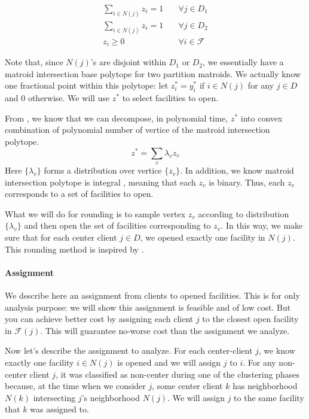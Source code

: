 \begin {align}
\sum_{i \in N(j)} z_i = 1 &\quad \forall j \in D_1 \\
\sum_{i \in N(j)} z_i = 1 &\quad \forall j \in D_2 \\
z_i \ge 0 &\quad \forall i \in \mathcal{F}
\end{align}

Note that, since $N(j)$'s are disjoint within $D_1$ or $D_2$, we essentially have
a matroid intersection base polytope for two partition matroids.
We actually know one fractional point within this polytope:
let $z^*_i = y^*_i$ if $i \in N(j)$ for any $j \in D$ and $0$ otherwise.
We will use $z^*$ to select facilities to open.

From \cite{grotschel1981ellipsoid}, we know that we can decompose,
in polynomial time, $z^*$ into convex combination of polynomial number of vertice of
the matroid intersection polytope.
\[  z^* = \sum_{v} \lambda_v z_v    \]
Here $\{\lambda_v\}$ forms a distribution over vertice $\{z_v\}$.
In addition, we know matroid intersection polytope is integral \cite{schrijver2003combinatorial},
meaning that each $z_v$ is binary. Thus, each $z_v$ corresponds to a set of facilities to open.

What we will do for rounding is to sample vertex $z_v$ according to distribution $\{\lambda_v\}$
and then open the set of facilities corresponding to $z_v$.
In this way, we make sure that for each center client $j \in D$, we opened exactly one facility in $N(j)$.
This rounding method is inspired by \cite{swamy2013improved}.

\paragraph{Assignment} We describe here an assignment from clients to opened facilities.
This is for only analysis purpose: we will show this assignment is feasible and of low cost.
But you can achieve better cost by assigning each client $j$ to the closest open facility in $\mathcal{F}(j)$.
This will guarantee no-worse cost than the assignment we analyze.

Now let's describe the assignment to analyze.
For each center-client $j$, we know exactly one facility $i \in N(j)$
is opened and we will assign $j$ to $i$.
For any non-center client $j$, it was classified as non-center during one of the clustering phases
because, at the time when we consider $j$, some center client $k$ has neighborhood $N(k)$
intersecting $j$'s neighborhood $N(j)$. We will assign $j$ to the same facility that $k$ was assigned to.

